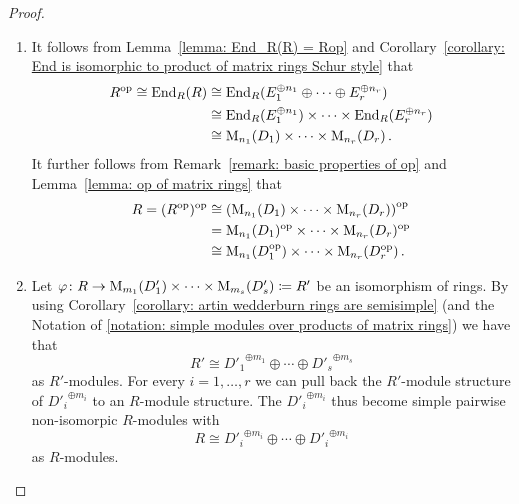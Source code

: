 \begin{proof}
  \leavevmode
  \begin{enumerate}
    \item
      It follows from Lemma~\ref{lemma: End_R(R) = Rop} and Corollary~\ref{corollary: End is isomorphic to product of matrix rings Schur style} that
      \begin{align*}
                R^{\mathrm{op}}
         \cong  \operatorname{End}_R(R)
        &\cong  \operatorname{End}_R(E_1^{\oplus n_1} \oplus \dotsb \oplus E_r^{\oplus n_r})  \\
        &\cong  \operatorname{End}_R(E_1^{\oplus n_1}) \times \dotsb \times \operatorname{End}_R(E_r^{\oplus n_r})  \\
        &\cong  \operatorname{M}_{n_1}(D_1) \times \dotsb \times \operatorname{M}_{n_r}(D_r) \,.
      \end{align*}
      It further follows from Remark~\ref{remark: basic properties of op} and Lemma~\ref{lemma: op of matrix rings} that
      \begin{align*}
                R
        =      (R^{\mathrm{op}})^{\mathrm{op}}
        &\cong  \left( \operatorname{M}_{n_1}(D_1) \times \dotsb \times \operatorname{M}_{n_r}(D_r) \right)^{\mathrm{op}} \\
        &=      \operatorname{M}_{n_1}(D_1)^{\mathrm{op}} \times \dotsb \times \operatorname{M}_{n_r}(D_r)^{\mathrm{op}}  \\
        &\cong  \operatorname{M}_{n_1}(D_1^{\mathrm{op}}) \times \dotsb \times \operatorname{M}_{n_r}(D_r^{\mathrm{op}}) \,.
      \end{align*}
    \item
      Let $\varphi \colon R \to \operatorname{M}_{m_1}(D'_1) \times \dotsb \times \operatorname{M}_{m_s}(D'_s) \coloneqq R'$ be an isomorphism of rings.
      By using Corollary~\ref{corollary: artin wedderburn rings are semisimple} (and the Notation of \ref{notation: simple modules over products of matrix rings}) we have that
      \[
              R'
        \cong {D'_1}^{\oplus m_1} \oplus \dotsb \oplus {D'_s}^{\oplus m_s}
      \]
      as $R'$-modules.
      For every $i = 1, \dotsc, r$ we can pull back the $R'$-module structure of ${D'_i}^{\oplus m_i}$ to an $R$-module structure.
      The ${D'_i}^{\oplus m_i}$ thus become simple pairwise non-isomorpic $R$-modules with
      \[
              R
        \cong {D'_i}^{\oplus m_i} \oplus \dotsb \oplus {D'_i}^{\oplus m_i}
      \]
      as $R$-modules.
      

\end{enumerate}
\end{proof}
